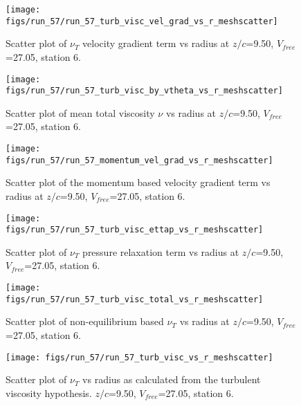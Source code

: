 \begin{figure}[H]
\centering
\texttt{[image: figs/run\_57/run\_57\_turb\_visc\_vel\_grad\_vs\_r\_meshscatter]}
\caption{Scatter plot of $\nu_T$ velocity gradient term vs radius at $z/c$=9.50, $V_{free}$=27.05, station 6.}
\end{figure}


\begin{figure}[H]
\centering
\texttt{[image: figs/run\_57/run\_57\_turb\_visc\_by\_vtheta\_vs\_r\_meshscatter]}
\caption{Scatter plot of mean total viscosity $\nu$ vs radius at $z/c$=9.50, $V_{free}$=27.05, station 6.}
\end{figure}


\begin{figure}[H]
\centering
\texttt{[image: figs/run\_57/run\_57\_momentum\_vel\_grad\_vs\_r\_meshscatter]}
\caption{Scatter plot of the momentum based velocity gradient term vs radius at $z/c$=9.50, $V_{free}$=27.05, station 6.}
\end{figure}


\begin{figure}[H]
\centering
\texttt{[image: figs/run\_57/run\_57\_turb\_visc\_ettap\_vs\_r\_meshscatter]}
\caption{Scatter plot of $\nu_T$ pressure relaxation term vs radius at $z/c$=9.50, $V_{free}$=27.05, station 6.}
\end{figure}


\begin{figure}[H]
\centering
\texttt{[image: figs/run\_57/run\_57\_turb\_visc\_total\_vs\_r\_meshscatter]}
\caption{Scatter plot of non-equilibrium based $\nu_T$ vs radius at $z/c$=9.50, $V_{free}$=27.05, station 6.}
\end{figure}


\begin{figure}[H]
\centering
\texttt{[image: figs/run\_57/run\_57\_turb\_visc\_vs\_r\_meshscatter]}
\caption{Scatter plot of $\nu_T$ vs radius as calculated from the turbulent viscosity hypothesis. $z/c$=9.50, $V_{free}$=27.05, station 6.}
\end{figure}



